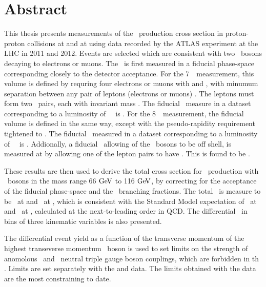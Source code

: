 \chapter*{Abstract}
This thesis presents measurements of the \ZZ\ production cross section in
proton-proton collisions at  and at  using data recorded
by the ATLAS experiment at the LHC in 2011 and 2012.  Events are selected which
are consistent with two \Z\ bosons decaying to electrons or muons. The \cx\ is
first measured in a fiducial phase-space corresponding closely to the detector
acceptance. For the 7~\tev\ measurement, this volume is defined by requring four
electrons or muons with  and , with minumum separation
between any pair of leptons (electrons or muons) . The leptons
must form two \ossf\ pairs, each with invariant mass \sstooos. The fiducial \cx\
measure in a dataset corresponding to a luminosity of
\LumiPassGRLTwentyEleven~\ifb\ is \ZZSevenTeVFiducialCrossSectionZZLLLL. For the
8~\tev\ measurement, the fiducial volume is defined in the same way, except with
the pseudo-rapidity requirement tightened to \modetalt{2.7}. The fiducial \cx\
measured in a dataset corresponding to a luminosity of
\LumiPassGRLTwentyTwelve~\ifb\ is \ZZEightTeVFiducialCrossSectionZZLLLL.
Addionally, a fiducial \cx\ allowing of the \Z\ bosons to be off shell, is
measured at \sqrtseq{7} by allowing one of the lepton pairs to have \mllgtt.
This is found to be \ZZSevenTeVFiducialCrossSectionZZsLLLL.

These results are then used to derive the total cross section for \ZZ\
production with \Z\ bosons in the mass range 66$\GeV$ to 116$\GeV$, by
correcting for the acceptance of the fiducial phase-space and the \Zll\
branching fractions. The total \cx\ is measure to be
\ZZSevenTeVTotalCrossSection\ at \sqrtseq{7} and \ZZEightTeVTotalCrossSection\ at
\sqrtseq{8}, which is consistent with the Standard Model
expectation of \ZZSevenTeVTheoryTotalCrossSection\ at \sqrtseq{7} and \ZZEightTeVTheoryTotalCrossSection\ at
\sqrtseq{8}, calculated at the next-to-leading order in QCD.
The differential \cx\ in bins of three kinematic variables is also
presented.

The differential event yield as a function of the transverse momentum of the
highest transeverse momentum \Z\ boson is used to set limits on the strength of
anomolous \ZZZ\ and \ZZg\ neutral triple gauge boson couplings, which are
forbidden in th \sm. Limits are set separately with the  and
\sqrtseq{8} data. The limits obtained with the \sqrtseq{8} data are the most
constraining to date.

